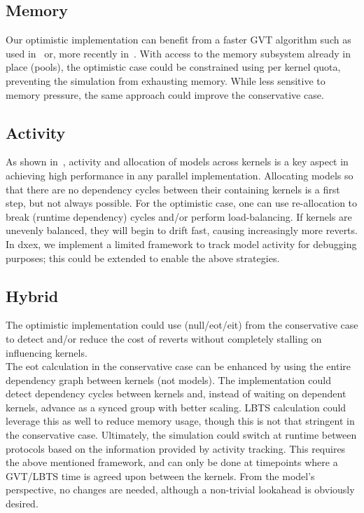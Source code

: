 
\subsection{Memory}
Our optimistic implementation can benefit from a faster GVT algorithm such
 as used in~\cite{Fujimoto:1997:CGV:268403.268404}  or, more recently in~\cite{Bauer:2005:SND:1069810.1070159}. 
With access to the memory subsystem already in place (pools), the optimistic case could be constrained using per kernel quota, preventing the simulation from exhausting memory. While less sensitive to memory pressure, the same approach could improve the conservative case.
\subsection{Activity}
As shown in~\cite{PythonPDEVS_ACTIMS}, activity and allocation of models across kernels is a key aspect in achieving high performance in any parallel implementation. Allocating models so that there are no dependency cycles between their containing kernels is a first step, but not always possible. For the optimistic case, one can use re-allocation to break (runtime dependency) cycles and/or perform load-balancing. If kernels are unevenly balanced, they will begin to drift fast, causing increasingly more reverts. In dxex, we implement a limited framework to track model activity for debugging purposes; this could be extended to enable the above strategies.
\subsection{Hybrid}
The optimistic implementation could use (null/eot/eit) from the conservative case to detect and/or reduce the cost of reverts without completely stalling on influencing kernels.\\
The eot calculation in the conservative case can be enhanced by using the entire dependency graph between kernels (not models). The implementation could detect dependency cycles between kernels and, instead of waiting on dependent kernels, advance as a synced group with better scaling. LBTS calculation could leverage this as well to reduce memory usage, though this is not that stringent in the conservative case.
Ultimately, the simulation could switch at runtime between protocols based on the information provided by activity tracking. This requires the above mentioned framework, and can only be done at timepoints where a GVT/LBTS time is agreed upon between the kernels. From the model's perspective, no changes are needed, although a non-trivial lookahead is obviously desired. 


